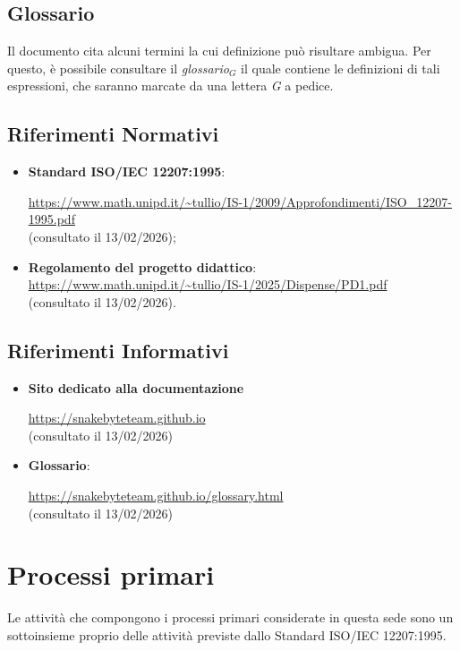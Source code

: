 \documentclass[10pt, letterpaper]{article}
\begin{document}
\subsection{Glossario}
Il documento cita alcuni termini la cui definizione può risultare ambigua. Per questo, è possibile consultare il \textit{glossario$_{G}$} il quale contiene le definizioni di tali espressioni, che saranno marcate da una lettera \textit{G} a pedice.

\subsection{Riferimenti Normativi}
\begin{itemize}
    \item \textbf{Standard ISO/IEC 12207:1995}:

        \url{https://www.math.unipd.it/~tullio/IS-1/2009/Approfondimenti/ISO_12207-1995.pdf}
        \\ (consultato il 13/02/2026);
    \item \textbf{Regolamento del progetto didattico}:
        \\ \url{https://www.math.unipd.it/~tullio/IS-1/2025/Dispense/PD1.pdf}
        \\ (consultato il 13/02/2026).
\end{itemize}

\subsection{Riferimenti Informativi}
\begin{itemize}
    \item \textbf{Sito dedicato alla documentazione}

        \url{https://snakebyteteam.github.io}
        \\ (consultato il 13/02/2026)

    \item \textbf{Glossario}:

        \url{https://snakebyteteam.github.io/glossary.html}
        \\(consultato il 13/02/2026)

\end{itemize}

\section{Processi primari}
Le attività  che compongono i processi primari considerate in questa sede sono un sottoinsieme proprio delle attività previste dallo Standard ISO/IEC 12207:1995.
\end{document}
